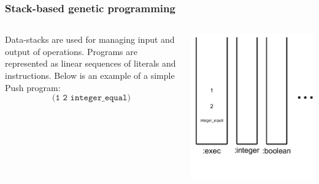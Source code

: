 \documentclass{beamer}
\newcommand{\linespace}{\vskip 0.25cm}
\begin{document}
\begin{frame}
	\frametitle{Stack-based genetic programming}
	\begin{columns}
		\begin{column}{0.6\textwidth}
			Data-stacks are used for managing input and output of operations.
			\linespace
			\linespace
			\linespace
			Programs are represented as linear sequences of literals and instructions. Below is an example of a simple Push program:
			\[\texttt{(1 2 integer\_equal)}\]
		\end{column}
		\begin{column}{0.4\textwidth}
			\includegraphics[height=1.2\textwidth]{Illustrations/stack_1.PDF}
		\end{column}
	\end{columns}
\end{frame}
\end{document}
